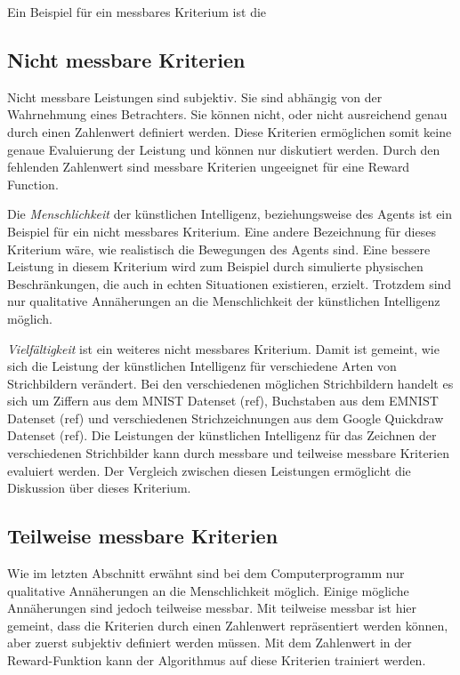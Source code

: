 Ein Beispiel für ein messbares Kriterium ist die 

\subsection*{Nicht messbare Kriterien}
Nicht messbare Leistungen sind subjektiv. Sie sind abhängig von der Wahrnehmung
eines Betrachters. Sie können nicht, oder nicht ausreichend genau durch einen
Zahlenwert definiert werden. Diese Kriterien ermöglichen somit keine genaue
Evaluierung der Leistung und können nur diskutiert werden. Durch den fehlenden
Zahlenwert sind messbare Kriterien ungeeignet für eine Reward Function.

Die \emph{Menschlichkeit} der künstlichen Intelligenz, beziehungsweise des
Agents ist ein Beispiel für ein nicht messbares Kriterium. Eine andere
Bezeichnung für dieses Kriterium wäre, wie realistisch die Bewegungen des Agents
sind. Eine bessere Leistung in diesem Kriterium wird zum Beispiel durch
simulierte physischen Beschränkungen, die auch in echten Situationen existieren,
erzielt. Trotzdem sind nur qualitative Annäherungen an die Menschlichkeit der
künstlichen Intelligenz möglich.  

\emph{Vielfältigkeit} ist ein weiteres nicht messbares Kriterium. Damit ist
gemeint, wie sich die Leistung der künstlichen Intelligenz für verschiedene
Arten von Strichbildern verändert. Bei den verschiedenen möglichen Strichbildern
handelt es sich um Ziffern aus dem MNIST Datenset (ref), Buchstaben aus
dem EMNIST Datenset (ref) und verschiedenen Strichzeichnungen aus dem  %
Google Quickdraw Datenset (ref). Die Leistungen der künstlichen Intelligenz für
das Zeichnen der verschiedenen Strichbilder kann durch messbare und teilweise
messbare Kriterien evaluiert werden. Der Vergleich zwischen diesen Leistungen
ermöglicht die Diskussion über dieses Kriterium.

\subsection*{Teilweise messbare Kriterien}
Wie im letzten Abschnitt erwähnt sind bei dem Computerprogramm nur qualitative
Annäherungen an die Menschlichkeit möglich. Einige mögliche Annäherungen sind
jedoch teilweise messbar. Mit teilweise messbar ist hier gemeint, dass die
Kriterien durch einen Zahlenwert repräsentiert werden können, aber zuerst
subjektiv definiert werden müssen. Mit dem Zahlenwert in der Reward-Funktion
kann der Algorithmus auf diese Kriterien trainiert werden.

